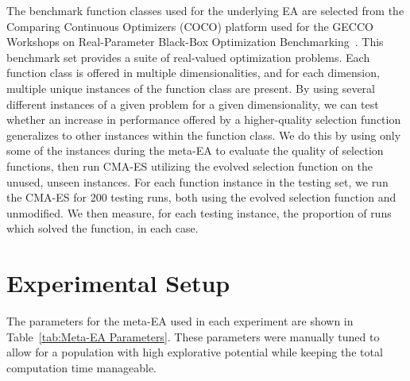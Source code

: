 \documentclass[sigconf]{acmart}
\begin{document}
The benchmark function classes used for the underlying EA are selected from the Comparing Continuous Optimizers (COCO) platform used for the GECCO Workshops on Real-Parameter Black-Box Optimization Benchmarking~\citep{cocobbob}. This benchmark set provides a suite of real-valued optimization problems. Each function class is offered in multiple dimensionalities, and for each dimension, multiple unique instances of the function class are present. By using several different instances of a given problem for a given dimensionality, we can test whether an increase in performance offered by a higher-quality selection function generalizes to other instances within the function class. We do this by using only some of the instances during the meta-EA to evaluate the quality of selection functions, then run CMA-ES utilizing the evolved selection function on the unused, unseen instances. For each function instance in the testing set, we run the CMA-ES for 200 testing runs, both using the evolved selection function and unmodified. We then measure, for each testing instance, the proportion of runs which solved the function, in each case. 

\section{Experimental Setup}
\label{Primary Experiments}

The parameters for the meta-EA used in each experiment are shown in Table~\ref{tab:Meta-EA Parameters}. These parameters were manually tuned to allow for a population with high explorative potential while keeping the total computation time manageable.
\end{document}
